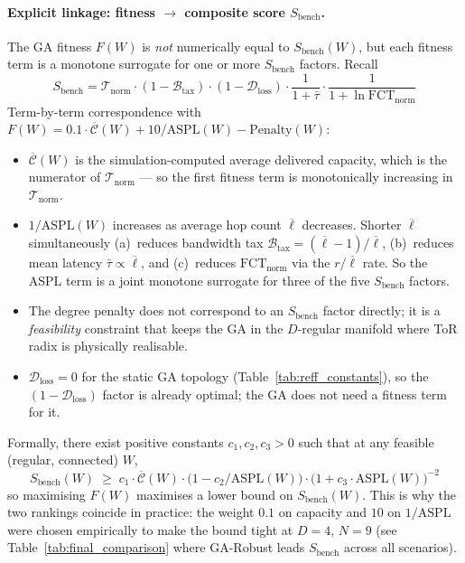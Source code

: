 \documentclass{article}
\begin{document}
    \paragraph{Explicit linkage: fitness $\to$ composite score $S_{\text{bench}}$.}
    \label{par:ga_fitness_score}
    The GA fitness $F(W)$ is \emph{not} numerically equal to $S_{\text{bench}}(W)$, but each fitness term is a monotone surrogate for one or more $S_{\text{bench}}$ factors.  Recall
    \[
        S_{\text{bench}} = \mathcal{T}_{\text{norm}} \cdot (1 - \mathcal{B}_{\text{tax}}) \cdot (1 - \mathcal{D}_{\text{loss}}) \cdot \frac{1}{1 + \bar{\tau}} \cdot \frac{1}{1 + \ln\mathrm{FCT}_{\text{norm}}}
    \]
    Term-by-term correspondence with $F(W) = 0.1\cdot\overline{\mathcal{C}}(W) + 10/\mathrm{ASPL}(W) - \text{Penalty}(W)$:
    \begin{itemize}
        \item $\overline{\mathcal{C}}(W)$ is the simulation-computed average delivered capacity, which is the numerator of $\mathcal{T}_{\text{norm}}$ --- so the first fitness term is monotonically increasing in $\mathcal{T}_{\text{norm}}$.
        \item $1/\mathrm{ASPL}(W)$ increases as average hop count $\overline{\ell}$ decreases.  Shorter $\overline{\ell}$ simultaneously (a)~reduces bandwidth tax $\mathcal{B}_{\text{tax}} = (\overline{\ell}-1)/\overline{\ell}$, (b)~reduces mean latency $\bar{\tau} \propto \overline{\ell}$, and (c)~reduces $\mathrm{FCT}_{\text{norm}}$ via the $r/\overline{\ell}$ rate.  So the ASPL term is a joint monotone surrogate for three of the five $S_{\text{bench}}$ factors.
        \item The degree penalty does not correspond to an $S_{\text{bench}}$ factor directly; it is a \emph{feasibility} constraint that keeps the GA in the $D$-regular manifold where ToR radix is physically realisable.
        \item $\mathcal{D}_{\text{loss}} = 0$ for the static GA topology (Table~\ref{tab:reff_constants}), so the $(1 - \mathcal{D}_{\text{loss}})$ factor is already optimal; the GA does not need a fitness term for it.
    \end{itemize}
    Formally, there exist positive constants $c_1, c_2, c_3 > 0$ such that at any feasible (regular, connected) $W$,
    \[
        S_{\text{bench}}(W) \;\ge\; c_1 \cdot \overline{\mathcal{C}}(W) \cdot \bigl(1 - c_2 / \mathrm{ASPL}(W)\bigr) \cdot \bigl(1 + c_3 \cdot \mathrm{ASPL}(W)\bigr)^{-2}
    \]
    so maximising $F(W)$ maximises a lower bound on $S_{\text{bench}}(W)$.  This is why the two rankings coincide in practice: the weight $0.1$ on capacity and $10$ on $1/\mathrm{ASPL}$ were chosen empirically to make the bound tight at $D = 4$, $N = 9$ (see Table~\ref{tab:final_comparison} where GA-Robust leads $S_{\text{bench}}$ across all scenarios).
\end{document}
